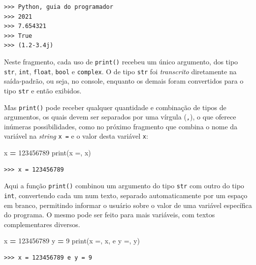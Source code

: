 \documentclass[
]{book}
\newenvironment{Shaded}{\begin{snugshade}}{\end{snugshade}}
\newcommand{\BuiltInTok}[1]{#1}
\newcommand{\DecValTok}[1]{\textcolor[rgb]{0.00,0.00,0.81}{#1}}
\newcommand{\NormalTok}[1]{#1}
\newcommand{\OperatorTok}[1]{\textcolor[rgb]{0.81,0.36,0.00}{\textbf{#1}}}
\newcommand{\StringTok}[1]{\textcolor[rgb]{0.31,0.60,0.02}{#1}}
\begin{document}
\begin{verbatim}
>>> Python, guia do programador
>>> 2021
>>> 7.654321
>>> True
>>> (1.2-3.4j)
\end{verbatim}

Neste fragmento, cada uso de \texttt{print()} recebeu um único argumento, dos tipo \texttt{str}, \texttt{int}, \texttt{float}, \texttt{bool} e \texttt{complex}. O de tipo \texttt{str} foi \emph{transcrito} diretamente na saída-padrão, ou seja, no console, enquanto os demais foram convertidos para o tipo \texttt{str} e então exibidos.

Mas \texttt{print()} pode receber qualquer quantidade e combinação de tipos de argumentos, os quais devem ser separados por uma vírgula (\texttt{,}), o que oferece inúmeras possibilidades, como no próximo fragmento que combina o nome da variável na \emph{string} \texttt{\textquotesingle{}x\ =\textquotesingle{}} e o valor desta variável \texttt{x}:

\begin{Shaded}
\begin{Highlighting}[]
\NormalTok{x }\OperatorTok{=} \DecValTok{123456789}
\BuiltInTok{print}\NormalTok{(}\StringTok{\textquotesingle{}x =\textquotesingle{}}\NormalTok{, x)}
\end{Highlighting}
\end{Shaded}

\begin{verbatim}
>>> x = 123456789
\end{verbatim}

Aqui a função \texttt{print()} combinou um argumento do tipo \texttt{str} com outro do tipo \texttt{int}, convertendo cada um num texto, separado automaticamente por um espaço em branco, permitindo informar o usuário sobre o valor de uma variável específica do programa. O mesmo pode ser feito para mais variáveis, com textos complementares diversos.

\begin{Shaded}
\begin{Highlighting}[]
\NormalTok{x }\OperatorTok{=} \DecValTok{123456789}
\NormalTok{y }\OperatorTok{=} \DecValTok{9}
\BuiltInTok{print}\NormalTok{(}\StringTok{\textquotesingle{}x =\textquotesingle{}}\NormalTok{, x, }\StringTok{\textquotesingle{}e y =\textquotesingle{}}\NormalTok{, y)}
\end{Highlighting}
\end{Shaded}

\begin{verbatim}
>>> x = 123456789 e y = 9
\end{verbatim}
\end{document}
